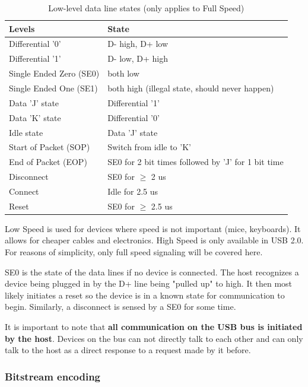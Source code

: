 \documentclass{article}
\begin{document}
\begin{table}[!htbp]
  \caption{Low-level data line states (only applies to Full Speed) \cite[p. 145]{usbstd}}
  \centering
  \begin{tabular}{l | l}
    Levels & State \\ \hline
    Differential '0' & D- high, D+ low \\
    Differential '1' & D- low, D+ high \\
    Single Ended Zero (SE0) & both low \\
    Single Ended One (SE1) & both high (illegal state, should never happen) \\
    Data 'J' state & Differential '1' \\
    Data 'K' state & Differential '0' \\
    Idle state & Data 'J' state \\
    Start of Packet (SOP) & Switch from idle to 'K' \\
    End of Packet (EOP) & SE0 for 2 bit times followed by 'J' for 1 bit time \\
    Disconnect & SE0 for $\geq$ 2 us \\
    Connect & Idle for 2.5 us \\
    Reset & SE0 for $\geq$ 2.5 us \\
  \end{tabular}
\end{table}

\pagebreak
Low Speed is used for devices where speed is not important (mice, keyboards).
It allows for cheaper cables and electronics. High Speed is only available
in USB 2.0. For reasons of simplicity, only full speed signaling will be covered
here. \cite[p. 12]{usbstd}

SE0 is the state of the data lines if no device is connected. The host
recognizes a device being plugged in by the D+ line being "pulled up" to high.
It then most likely initiates a reset so the device is in a known state for
communication to begin. Similarly, a disconnect is sensed by a SE0 for some time.
\cite[p. 149]{usbstd}

It is important to note that {\bf all communication on the USB bus is initiated by the
host}. Devices on the bus can not directly talk to each other and can only talk
to the host as a direct response to a request made by it before.
\cite[p. 27]{usbstd}

\subsubsection{Bitstream encoding}
\end{document}
